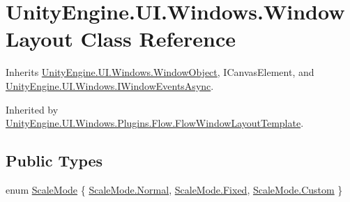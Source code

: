 \hypertarget{class_unity_engine_1_1_u_i_1_1_windows_1_1_window_layout}{}\section{Unity\+Engine.\+U\+I.\+Windows.\+Window\+Layout Class Reference}
\label{class_unity_engine_1_1_u_i_1_1_windows_1_1_window_layout}


Inherits \hyperlink{class_unity_engine_1_1_u_i_1_1_windows_1_1_window_object}{Unity\+Engine.\+U\+I.\+Windows.\+Window\+Object}, I\+Canvas\+Element, and \hyperlink{interface_unity_engine_1_1_u_i_1_1_windows_1_1_i_window_events_async}{Unity\+Engine.\+U\+I.\+Windows.\+I\+Window\+Events\+Async}.



Inherited by \hyperlink{class_unity_engine_1_1_u_i_1_1_windows_1_1_plugins_1_1_flow_1_1_flow_window_layout_template}{Unity\+Engine.\+U\+I.\+Windows.\+Plugins.\+Flow.\+Flow\+Window\+Layout\+Template}.

\subsection*{Public Types}
\begin{DoxyCompactItemize}
\item 
enum \hyperlink{class_unity_engine_1_1_u_i_1_1_windows_1_1_window_layout_ad2ea7c8dd3f2f3c0edc178901af60728}{Scale\+Mode} \{ \hyperlink{class_unity_engine_1_1_u_i_1_1_windows_1_1_window_layout_ad2ea7c8dd3f2f3c0edc178901af60728a960b44c579bc2f6818d2daaf9e4c16f0}{Scale\+Mode.\+Normal}, 
\hyperlink{class_unity_engine_1_1_u_i_1_1_windows_1_1_window_layout_ad2ea7c8dd3f2f3c0edc178901af60728a4457d440870ad6d42bab9082d9bf9b61}{Scale\+Mode.\+Fixed}, 
\hyperlink{class_unity_engine_1_1_u_i_1_1_windows_1_1_window_layout_ad2ea7c8dd3f2f3c0edc178901af60728a90589c47f06eb971d548591f23c285af}{Scale\+Mode.\+Custom}
 \}
\end{DoxyCompactItemize}
